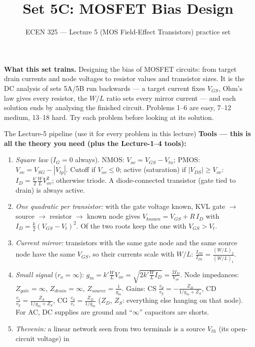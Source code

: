 \documentclass[11pt]{article}
\title{Set 5C: MOSFET Bias Design}
\author{ECEN 325 --- Lecture 5 (MOS Field-Effect Transistors) practice set}
\date{}
\begin{document}
\maketitle

\textbf{What this set trains.} Designing the bias of MOSFET circuits: from target drain currents and node voltages
to resistor values and transistor sizes. It is the DC analysis of sets 5A/5B run backwards --- a target current
fixes $V_{GS}$, Ohm's law gives every resistor, the $W/L$ ratio sets every mirror current --- and each solution ends
by analysing the finished circuit. Problems 1--6 are easy, 7--12 medium, 13--18 hard. Try each problem before looking
at its solution.


\begin{cardbox}{The Lecture-5 pipeline (use it for every problem in this lecture)}
\textbf{Tools --- this is all the theory you need (plus the Lecture-1--4 tools):}
\begin{enumerate}[label=\textbf{T\arabic*},leftmargin=2.2em,itemsep=1pt]
\item \emph{Square law} ($I_G = 0$ always). NMOS: $V_{ov} = V_{GS} - V_{tn}$; PMOS: $V_{ov} = V_{SG} - |V_{tp}|$.
      Cutoff if $V_{ov}\le 0$; active (saturation) if $|V_{DS}| \ge V_{ov}$:
      $I_D = \frac{k'}{2}\frac{W}{L}V_{ov}^2$; otherwise triode.
      A diode-connected transistor (gate tied to drain) is always active.
\item \emph{One quadratic per transistor:} with the gate voltage known, KVL gate $\to$ source $\to$ resistor $\to$
      known node gives $V_{known} = V_{GS} + R\,I_D$ with $I_D = \frac{k}{2}(V_{GS}-V_t)^2$. Of the two roots keep
      the one with $V_{GS} > V_t$.
\item \emph{Current mirror:} transistors with the same gate node and the same source node have the same $V_{GS}$,
      so their currents scale with $W/L$: $\frac{I_{D2}}{I_{D1}} = \frac{(W/L)_2}{(W/L)_1}$.
\item \emph{Small signal} ($r_o = \infty$): $g_m = k'\frac{W}{L}V_{ov} = \sqrt{2k'\frac{W}{L}I_D} = \frac{2I_D}{V_{ov}}$.
      Node impedances: $Z_{gate} = \infty$, $Z_{drain} = \infty$, $Z_{source} = \frac{1}{g_m}$. Gains: CS
      $\frac{v_d}{v_g} = -\frac{Z_D}{1/g_m + Z_S}$, CD $\frac{v_s}{v_g} = \frac{Z_S}{1/g_m + Z_S}$, CG
      $\frac{v_d}{v_s} = \frac{Z_D}{1/g_m}$ ($Z_D$, $Z_S$: everything else hanging on that node). For AC, DC supplies
      are ground and ``$\infty$'' capacitors are shorts.
\item \emph{Thevenin:} a linear network seen from two terminals is a source $V_{th}$ (its open-circuit voltage) in

\end{enumerate}
\end{cardbox}
\end{document}
